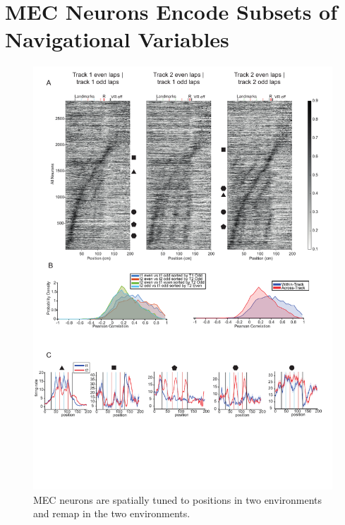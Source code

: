 \chapter{MEC Neurons Encode Subsets of Navigational Variables}
\label{chapterlabel5}

\begin{figure}
    \centering
    \includegraphics[width=1\linewidth]{figures//Chapter 5 MEC/fig1_MEC_spatial_tuning.pdf}
    \caption{MEC neurons are spatially tuned to positions in two environments and remap in the two environments.}
    \label{fig:MEC remapping}
\end{figure}


